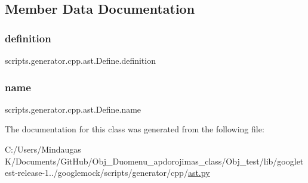 \subsection{Member Data Documentation}
\mbox{\label{classscripts_1_1generator_1_1cpp_1_1ast_1_1_define_a32fde3b320775b8e16c4373e3ec3e90c}} 
\subsubsection{\texorpdfstring{definition}{definition}}
{\footnotesize\ttfamily scripts.\+generator.\+cpp.\+ast.\+Define.\+definition}

\mbox{\label{classscripts_1_1generator_1_1cpp_1_1ast_1_1_define_addce716c7a659f00116fa353bc14bbbb}} 
\subsubsection{\texorpdfstring{name}{name}}
{\footnotesize\ttfamily scripts.\+generator.\+cpp.\+ast.\+Define.\+name}



The documentation for this class was generated from the following file\+:\begin{DoxyCompactItemize}
\item 
C\+:/\+Users/\+Mindaugas K/\+Documents/\+Git\+Hub/\+Obj\+\_\+\+Duomenu\+\_\+apdorojimas\+\_\+class/\+Obj\+\_\+test/lib/googletest-\/release-\/1../googlemock/scripts/generator/cpp/\mbox{\hyperlink{_obj__test_2lib_2googletest-release-1_88_81_2googlemock_2scripts_2generator_2cpp_2ast_8py}{ast.\+py}}\end{DoxyCompactItemize}
